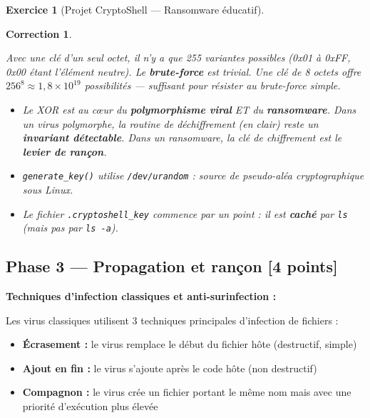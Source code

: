 \documentclass[a4paper,11pt]{article}
\theoremstyle{plain}
\newtheorem{correction}{Correction}
\theoremstyle{definition}
\newtheorem{exercice}{Exercice}
\begin{document}
\begin{exercice}[Projet CryptoShell --- Ransomware éducatif]
\begin{correction}
\begin{attention}
Avec une clé d'un seul octet, il n'y a que 255 variantes possibles (0x01 à 0xFF, 0x00 étant l'élément neutre). Le \textbf{brute-force} est trivial. Une clé de 8 octets offre $256^8 \approx 1{,}8 \times 10^{19}$ possibilités --- suffisant pour résister au brute-force simple.
\end{attention}

\begin{pointcle}
\begin{itemize}
    \item Le XOR est au c\oe ur du \textbf{polymorphisme viral} ET du \textbf{ransomware}. Dans un virus polymorphe, la routine de déchiffrement (en clair) reste un \textbf{invariant détectable}. Dans un ransomware, la clé de chiffrement est le \textbf{levier de rançon}.
    \item \texttt{generate\_key()} utilise \texttt{/dev/urandom} : source de pseudo-aléa cryptographique sous Linux.
    \item Le fichier \texttt{.cryptoshell\_key} commence par un point : il est \textbf{caché} par \texttt{ls} (mais pas par \texttt{ls -a}).
\end{itemize}
\end{pointcle}

\end{correction}



\subsection*{Phase 3 --- Propagation et rançon \hfill \normalsize [4 points]}

\begin{rappel}
\textbf{Techniques d'infection classiques et anti-surinfection :}

Les virus classiques utilisent 3 techniques principales d'infection de fichiers :
\begin{itemize}
    \item \textbf{Écrasement :} le virus remplace le début du fichier hôte (destructif, simple)
    \item \textbf{Ajout en fin :} le virus s'ajoute après le code hôte (non destructif)
    \item \textbf{Compagnon :} le virus crée un fichier portant le même nom mais avec une priorité d'exécution plus élevée
\end{itemize}


\end{rappel}
\end{exercice}
\end{document}
